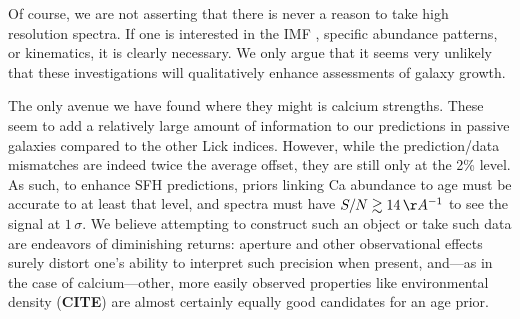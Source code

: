 \documentclass[a4paper,fleqn,usenatbib]{mnras}
\newcommand{\bfr}{\bf\color{red}}
\newcommand{\CITE}{{\bfr CITE}}
\begin{document}




Of course, we are not asserting that there is never a reason to take high resolution spectra. If 
one is interested in the IMF \citep{Conroy12}, specific abundance patterns, or kinematics, it is 
clearly necessary. We only argue that it seems very unlikely that these investigations will
qualitatively enhance assessments of galaxy growth.

The only avenue we have found where they might is calcium strengths. These seem to 
add a relatively large amount of information to our predictions in passive galaxies compared
to the other Lick indices. However, while the prediction/data mismatches are indeed twice the 
average offset, they are still only at the 2\% level. As such, to enhance SFH predictions, priors 
linking Ca abundance to age must be accurate to at least that level, and spectra must have 
$S/N\gtrsim14\,\AA^{-1}$ to see the signal at $1\,\sigma$. We believe attempting to construct 
such an object or take such data are endeavors of diminishing returns: aperture and other 
observational effects surely distort one's ability to interpret such precision when present, 
and---as in the case of calcium---other, more easily observed properties like environmental 
density (\CITE) are almost certainly equally good candidates for an age prior.
\end{document}
